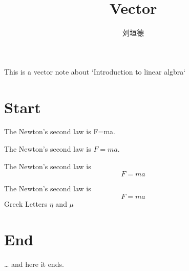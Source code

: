 \documentclass[leqno]{article}
\author{刘垣德}
\title{Vector}
\begin{document}
\maketitle
This is a vector note about `Introduction to linear algbra`
\section{Start}
The Newton's second law is F=ma.

The Newton's second law is $F=ma$.

The Newton's second law is
$$F=ma$$

The Newton's second law is
\[F=ma\]
Greek Letters $\eta$ and $\mu$

\section{End}
\ldots{} and here it ends.
\end{document}
